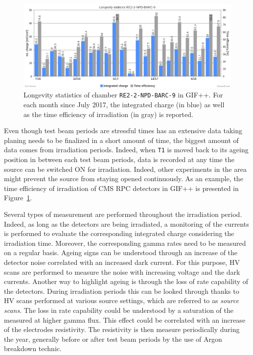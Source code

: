	\begin{figure}[H]
        \centering
		\includegraphics[width = \linewidth]{fig/chapt5/GIFpp-irradiation-statistics.png}
		\caption{\label{fig:Irr-stat} Longevity statistics of chamber \texttt{RE2-2-NPD-BARC-9} in GIF++. For each month since July 2017, the integrated charge (in blue) as well as the time efficiency of irradiation (in gray) is reported.}
	\end{figure}
	
	Even though test beam periods are stressful times has an extensive data taking planing needs to be finalized in a short amount of time, the biggest amount of data comes from irradiation periods. Indeed, when \texttt{T1} is moved back to its ageing position in between each test beam periods, data is recorded at any time the source can be switched ON for irradiation. Indeed, other experiments in the area might prevent the source from staying opened continuously. As an example, the time efficiency of irradiation of CMS RPC detectors in GIF++ is presented in Figure~\ref{fig:Irr-stat}.
	
	Several types of measurement are performed throughout the irradiation period. Indeed, as long as the detectors are being irradiated, a monitoring of the currents is performed to evaluate the corresponding integrated charge considering the irradiation time. Moreover, the corresponding gamma rates need to be measured on a regular basis. Ageing signs can be understood through an increase of the detector noise correlated with an increased dark current. For this purpose, HV scans are performed to measure the noise with increasing voltage and the dark currents. Another way to highlight ageing is through the loss of rate capability of the detectors. During irradiation periods this can be looked through thanks to HV scans performed at various source settings, which are referred to as \textit{source scans}. The loss in rate capability could be understood by a saturation of the measured at higher gamma flux. This effect could be correlated with an increase of the electrodes resistivity. The resistivity is then measure periodically during the year, generally before or after test beam periods by the use of Argon breakdown technic.
	
